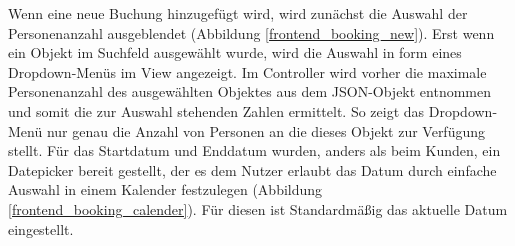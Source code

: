 
Wenn eine neue Buchung hinzugefügt wird, wird zunächst die Auswahl der Personenanzahl ausgeblendet (Abbildung \ref{frontend_booking_new}).
Erst wenn ein Objekt im Suchfeld ausgewählt wurde, wird die Auswahl in form eines Dropdown-Menüs im View angezeigt.
Im Controller wird vorher die maximale Personenanzahl des ausgewählten Objektes aus dem JSON-Objekt entnommen und somit
die zur Auswahl stehenden Zahlen ermittelt. So zeigt das Dropdown-Menü nur genau die Anzahl von Personen an die dieses Objekt zur Verfügung stellt.
Für das Startdatum und Enddatum wurden, anders als beim Kunden, ein Datepicker bereit gestellt, der es dem Nutzer erlaubt das Datum durch einfache Auswahl in
einem Kalender festzulegen (Abbildung \ref{frontend_booking_calender}). Für diesen ist Standardmäßig das aktuelle Datum eingestellt.

